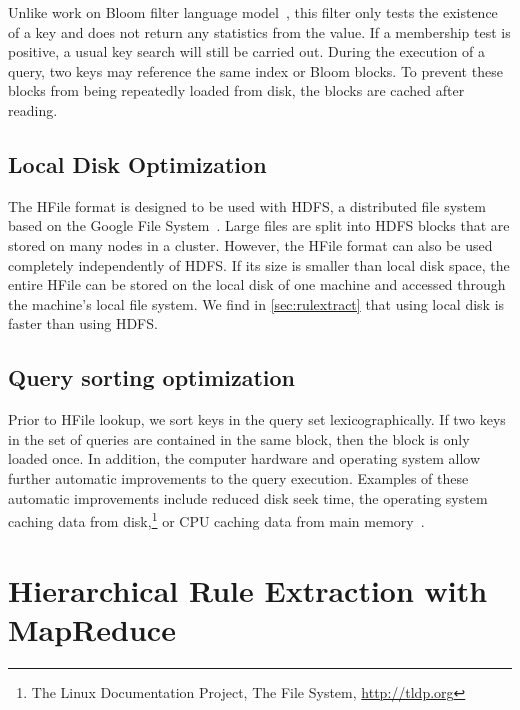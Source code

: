 Unlike work on Bloom filter language
model~\citep{talbot-osborne:2007:ACL,talbot-osborne:2007:EMNLP-CoNLL}, this
filter only tests the existence of a key and does not return any statistics from
the value. If a membership test is positive, a usual key search will
still be carried out. During the execution of a query, two keys may
reference the same index or Bloom blocks. To prevent these blocks from being
repeatedly loaded from disk, the blocks are cached after reading.

\subsection{Local Disk Optimization}

The HFile format is designed to be used with HDFS, a distributed file system
based on the Google File System~\citep{ghemawat-gobioff-leung:2003:OSP}. Large
files are split into HDFS blocks that are stored on many nodes in a cluster.
However, the HFile format can also be used completely independently of HDFS. If
its size is smaller than local disk space, the entire HFile can be stored on the local
disk of one machine and accessed through the machine's local file system. We
find in \autoref{sec:rulextract} that using local disk
is faster than using HDFS.

\subsection{Query sorting optimization}
\label{sec:querySortingOptimization}

Prior to HFile lookup, we sort keys in the query set lexicographically. If two
keys in the set of queries are contained in the same block, then the block is
only loaded once. In addition, the computer hardware and operating system allow
further automatic improvements to the query execution. Examples of these
automatic improvements include reduced disk seek time, the operating system
caching data from
disk,\footnote{The Linux Documentation Project, The File System, \url{http://tldp.org}}
or CPU caching data from main memory~\citep{patterson-hennessy:2005:COA}.

\section{Hierarchical Rule Extraction with MapReduce}
\label{sec:rulextractMapReduce}


